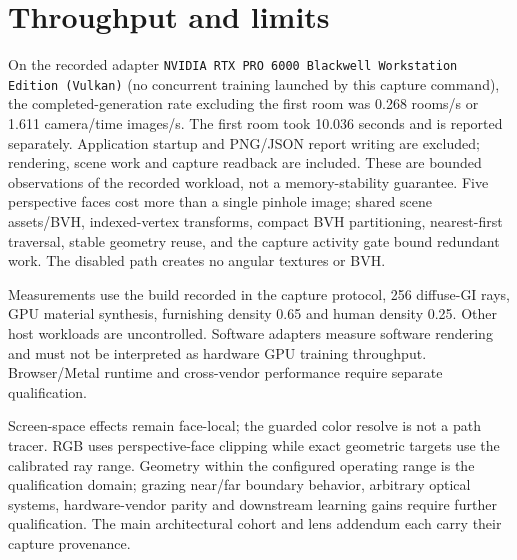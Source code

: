 \section{Throughput and limits}
On the recorded adapter \texttt{NVIDIA RTX PRO 6000 Blackwell Workstation Edition (Vulkan)} (no concurrent training launched by this capture command), the completed-generation rate excluding the first room was 0.268 rooms/s or 1.611 camera/time images/s. The first room took 10.036 seconds and is reported separately. Application startup and PNG/JSON report writing are excluded; rendering, scene work and capture readback are included. These are bounded observations of the recorded workload, not a memory-stability guarantee. Five perspective faces cost more than a single pinhole image; shared scene assets/BVH, indexed-vertex transforms, compact BVH partitioning, nearest-first traversal, stable geometry reuse, and the capture activity gate bound redundant work. The disabled path creates no angular textures or BVH.

Measurements use the build recorded in the capture protocol, 256 diffuse-GI rays, GPU material synthesis, furnishing density 0.65 and human density 0.25. Other host workloads are uncontrolled. Software adapters measure software rendering and must not be interpreted as hardware GPU training throughput. Browser/Metal runtime and cross-vendor performance require separate qualification.

Screen-space effects remain face-local; the guarded color resolve is not a path tracer. RGB uses perspective-face clipping while exact geometric targets use the calibrated ray range. Geometry within the configured operating range is the qualification domain; grazing near/far boundary behavior, arbitrary optical systems, hardware-vendor parity and downstream learning gains require further qualification. The main architectural cohort and lens addendum each carry their capture provenance.

